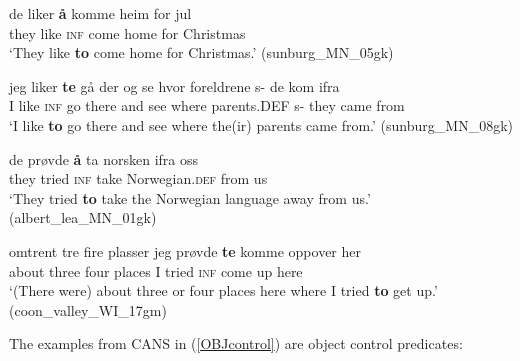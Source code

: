 \documentclass[output=paper,colorlinks,citecolor=brown]{langscibook}
\begin{document}
\begin{exe} 

\item \label{controlamno}

\begin{xlist}


\item \label{control1} \gll de liker \textbf{{\aa}} komme heim for jul \\
        they like \textsc{inf} come home for Christmas \\
         \glt `They like \textbf{to} come home for Christmas.' \hfill(sunburg\_MN\_05gk)

\item \label{control2} \gll jeg liker \textbf{te} gå der og se hvor foreldrene s- de kom ifra \\
        I like \textsc{inf} go there and see where parents.DEF s- they came from \\
         \glt `I like \textbf{to} go there and see where the(ir) parents came from.' \hfill(sunburg\_MN\_08gk)
         
\item \label{control3} \gll de prøvde \textbf{{\aa}} ta norsken ifra oss \\
        they tried \textsc{inf} take Norwegian.\textsc{def} from us \\
         \glt `They tried \textbf{to} take the Norwegian language away from us.' \hfill(albert\_lea\_MN\_01gk)
         
\item \label{control4} \gll omtrent tre fire plasser jeg prøvde \textbf{te} komme oppover her \\
        about three four places I tried \textsc{inf} come up here \\
         \glt `(There were) about three or four places here where I tried \textbf{to} get up.' \hfill(coon\_valley\_WI\_17gm)
         

\end{xlist}
\end{exe}

The examples from CANS in (\ref{OBJcontrol}) are object control predicates:
\end{document}
